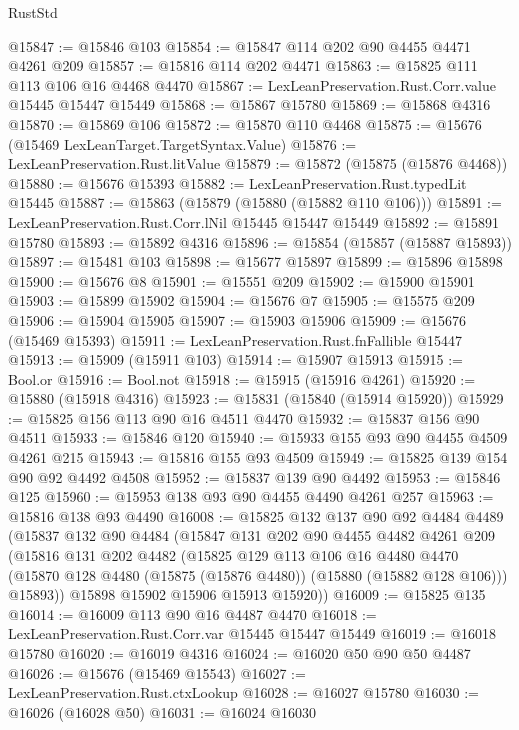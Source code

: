\begin{lexlean}{RustStd}
\begin{coremodule}
@15847 := @15846 @103
@15854 := @15847 @114 @202 @90 @4455 @4471 @4261 @209
@15857 := @15816 @114 @202 @4471
@15863 := @15825 @111 @113 @106 @16 @4468 @4470
@15867 := LexLeanPreservation.Rust.Corr.value @15445 @15447 @15449
@15868 := @15867 @15780
@15869 := @15868 @4316
@15870 := @15869 @106
@15872 := @15870 @110 @4468
@15875 := @15676 (@15469 LexLeanTarget.TargetSyntax.Value)
@15876 := LexLeanPreservation.Rust.litValue
@15879 := @15872 (@15875 (@15876 @4468))
@15880 := @15676 @15393
@15882 := LexLeanPreservation.Rust.typedLit @15445
@15887 := @15863 (@15879 (@15880 (@15882 @110 @106)))
@15891 := LexLeanPreservation.Rust.Corr.lNil @15445 @15447 @15449
@15892 := @15891 @15780
@15893 := @15892 @4316
@15896 := @15854 (@15857 (@15887 @15893))
@15897 := @15481 @103
@15898 := @15677 @15897
@15899 := @15896 @15898
@15900 := @15676 @8
@15901 := @15551 @209
@15902 := @15900 @15901
@15903 := @15899 @15902
@15904 := @15676 @7
@15905 := @15575 @209
@15906 := @15904 @15905
@15907 := @15903 @15906
@15909 := @15676 (@15469 @15393)
@15911 := LexLeanPreservation.Rust.fnFallible @15447
@15913 := @15909 (@15911 @103)
@15914 := @15907 @15913
@15915 := Bool.or
@15916 := Bool.not
@15918 := @15915 (@15916 @4261)
@15920 := @15880 (@15918 @4316)
@15923 := @15831 (@15840 (@15914 @15920))
@15929 := @15825 @156 @113 @90 @16 @4511 @4470
@15932 := @15837 @156 @90 @4511
@15933 := @15846 @120
@15940 := @15933 @155 @93 @90 @4455 @4509 @4261 @215
@15943 := @15816 @155 @93 @4509
@15949 := @15825 @139 @154 @90 @92 @4492 @4508
@15952 := @15837 @139 @90 @4492
@15953 := @15846 @125
@15960 := @15953 @138 @93 @90 @4455 @4490 @4261 @257
@15963 := @15816 @138 @93 @4490
@16008 := @15825
    @132
    @137
    @90
    @92
    @4484
    @4489
    (@15837
      @132
      @90
      @4484
      (@15847
        @131
        @202
        @90
        @4455
        @4482
        @4261
        @209
        (@15816
          @131
          @202
          @4482
          (@15825
            @129
            @113
            @106
            @16
            @4480
            @4470
            (@15870 @128 @4480 (@15875 (@15876 @4480)) (@15880 (@15882 @128 @106)))
            @15893))
        @15898
        @15902
        @15906
        @15913
        @15920))
@16009 := @15825 @135
@16014 := @16009 @113 @90 @16 @4487 @4470
@16018 := LexLeanPreservation.Rust.Corr.var @15445 @15447 @15449
@16019 := @16018 @15780
@16020 := @16019 @4316
@16024 := @16020 @50 @90 @50 @4487
@16026 := @15676 (@15469 @15543)
@16027 := LexLeanPreservation.Rust.ctxLookup
@16028 := @16027 @15780
@16030 := @16026 (@16028 @50)
@16031 := @16024 @16030

\end{coremodule}
\end{lexlean}
